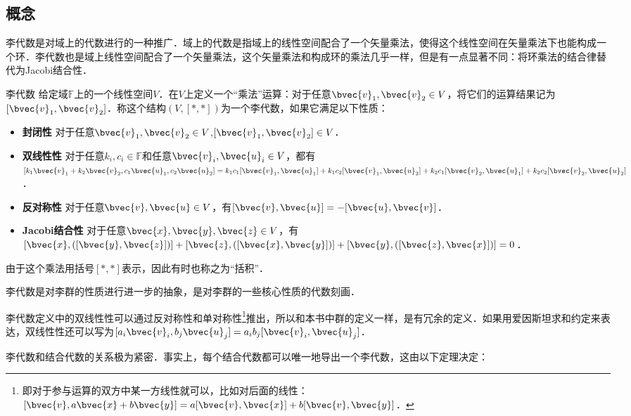 
\subsection{概念}

李代数是对域上的代数进行的一种推广．域上的代数是指域上的线性空间配合了一个矢量乘法，使得这个线性空间在矢量乘法下也能构成一个环．李代数也是域上线性空间配合了一个矢量乘法，这个矢量乘法和构成环的乘法几乎一样，但是有一点显著不同：将环乘法的结合律替代为Jacobi结合性．

\begin{definition}{李代数}
给定域$\mathbb{F}$上的一个线性空间$V$．在$V$上定义一个“乘法”运算：对于任意$\bvec{v}_1, \bvec{v}_2\in V$，将它们的运算结果记为$[\bvec{v}_1, \bvec{v}_2]$．称这个结构$(V, [*, *])$为一个李代数，如果它满足以下性质：
\begin{itemize}
\item \textbf{封闭性} 对于任意$\bvec{v}_1, \bvec{v}_2\in V$,$[\bvec{v}_1, \bvec{v}_2]\in V$．
\item \textbf{双线性性} 对于任意$k_i, c_i\in \mathbb{F}$和任意$\bvec{v}_i, \bvec{u}_i\in V$，都有$[k_1\bvec{v}_1+k_2\bvec{v}_2, c_1\bvec{u}_1, c_2\bvec{u}_2]=k_1c_1[\bvec{v}_1, \bvec{u}_1]+k_1c_2[\bvec{v}_1, \bvec{u}_2]+k_2c_1[\bvec{v}_2, \bvec{u}_1]+k_2c_2[\bvec{v}_2, \bvec{u}_2]$．
\item \textbf{反对称性} 对于任意$\bvec{v}, \bvec{u}\in V$，有$[\bvec{v}, \bvec{u}]=-[\bvec{u}, \bvec{v}]$．
\item \textbf{Jacobi结合性} 对于任意$\bvec{x}, \bvec{y}, \bvec{z}\in V$，有$[\bvec{x}, ([\bvec{y}, \bvec{z}])]+[\bvec{z}, ([\bvec{x}, \bvec{y}])]+[\bvec{y}, ([\bvec{z}, \bvec{x}])]=0$．
\end{itemize}

由于这个乘法用括号$[*, *]$表示，因此有时也称之为“括积”．
\end{definition}

李代数是对李群的性质进行进一步的抽象，是对李群的一些核心性质的代数刻画．

李代数定义中的双线性性可以通过反对称性和单对称性\footnote{即对于参与运算的双方中某一方线性就可以，比如对后面的线性：$[\bvec{v},a\bvec{x}+b\bvec{y}]=a[\bvec{v}, \bvec{x}]+b[\bvec{v}, \bvec{y}]$．}推出，所以和本书中群的定义一样，是有冗余的定义．如果用爱因斯坦求和约定来表达，双线性性还可以写为$[a_i\bvec{v}_i, b_j\bvec{u}_j]=a_ib_j[\bvec{v}_i, \bvec{u}_j]$．

李代数和结合代数的关系极为紧密．事实上，每个结合代数都可以唯一地导出一个李代数，这由以下定理决定：

